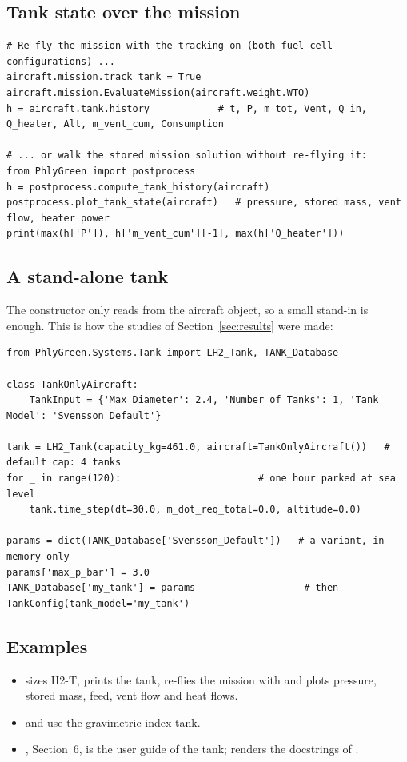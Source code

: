 \documentclass[a4paper,11pt]{article}
\begin{document}
\subsection{Tank state over the mission}
\begin{lstlisting}
# Re-fly the mission with the tracking on (both fuel-cell configurations) ...
aircraft.mission.track_tank = True
aircraft.mission.EvaluateMission(aircraft.weight.WTO)
h = aircraft.tank.history            # t, P, m_tot, Vent, Q_in, Q_heater, Alt, m_vent_cum, Consumption

# ... or walk the stored mission solution without re-flying it:
from PhlyGreen import postprocess
h = postprocess.compute_tank_history(aircraft)
postprocess.plot_tank_state(aircraft)   # pressure, stored mass, vent flow, heater power
print(max(h['P']), h['m_vent_cum'][-1], max(h['Q_heater']))
\end{lstlisting}

\subsection{A stand-alone tank}
The constructor only reads  from the aircraft object, so a small stand-in is
enough. This is how the studies of Section~\ref{sec:results} were made:
\begin{lstlisting}
from PhlyGreen.Systems.Tank import LH2_Tank, TANK_Database

class TankOnlyAircraft:
    TankInput = {'Max Diameter': 2.4, 'Number of Tanks': 1, 'Tank Model': 'Svensson_Default'}

tank = LH2_Tank(capacity_kg=461.0, aircraft=TankOnlyAircraft())   # default cap: 4 tanks
for _ in range(120):                        # one hour parked at sea level
    tank.time_step(dt=30.0, m_dot_req_total=0.0, altitude=0.0)

params = dict(TANK_Database['Svensson_Default'])   # a variant, in memory only
params['max_p_bar'] = 3.0
TANK_Database['my_tank'] = params                   # then TankConfig(tank_model='my_tank')
\end{lstlisting}

\subsection{Examples}
\begin{itemize}
\item {} sizes H2-T, prints the tank, re-flies the mission with
   and plots pressure, stored mass, feed, vent flow and heat flows.
\item {} and  use the
  gravimetric-index tank.
\item {}, Section~6, is the user guide of the tank;
   renders the docstrings of .
\end{itemize}
\end{document}
